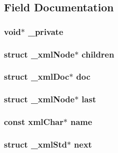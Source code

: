 \subsection{Field Documentation}
\hypertarget{struct__xml_std_a1cb76d737bf6f5b53e6c970073cba051}{
\subsubsection[{\_\-private}]{\setlength{\rightskip}{0pt plus 5cm}void$\ast$ {\bf \_\-private}}}
\label{struct__xml_std_a1cb76d737bf6f5b53e6c970073cba051}
\hypertarget{struct__xml_std_aff6ebaaa61a2b60c033a82790133fb5e}{
\subsubsection[{children}]{\setlength{\rightskip}{0pt plus 5cm}struct \_\-xmlNode$\ast$ {\bf children}}}
\label{struct__xml_std_aff6ebaaa61a2b60c033a82790133fb5e}
\hypertarget{struct__xml_std_aeeffa6cba73333db3d9b2aa59f366304}{
\subsubsection[{doc}]{\setlength{\rightskip}{0pt plus 5cm}struct \_\-xmlDoc$\ast$ {\bf doc}}}
\label{struct__xml_std_aeeffa6cba73333db3d9b2aa59f366304}
\hypertarget{struct__xml_std_a557b64ca596f6376407afcd1b0c959a7}{
\subsubsection[{last}]{\setlength{\rightskip}{0pt plus 5cm}struct \_\-xmlNode$\ast$ {\bf last}}}
\label{struct__xml_std_a557b64ca596f6376407afcd1b0c959a7}
\hypertarget{struct__xml_std_a9d09be92db244aa2ecd5921f41f43ded}{
\subsubsection[{name}]{\setlength{\rightskip}{0pt plus 5cm}const xmlChar$\ast$ {\bf name}}}
\label{struct__xml_std_a9d09be92db244aa2ecd5921f41f43ded}
\hypertarget{struct__xml_std_af14a9735a8fc3d702c0e5c7b4a23c807}{
\subsubsection[{next}]{\setlength{\rightskip}{0pt plus 5cm}struct {\bf \_\-xmlStd}$\ast$ {\bf next}}}
